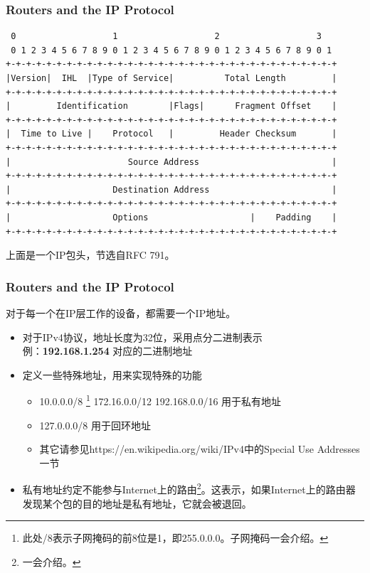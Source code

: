 \documentclass[11pt]{beamer}
\begin{document}
\begin{frame}[fragile]
\frametitle{Routers and the IP Protocol}
\fontsize{9pt}{9pt}
\begin{verbatim}
 0                   1                   2                   3
 0 1 2 3 4 5 6 7 8 9 0 1 2 3 4 5 6 7 8 9 0 1 2 3 4 5 6 7 8 9 0 1
+-+-+-+-+-+-+-+-+-+-+-+-+-+-+-+-+-+-+-+-+-+-+-+-+-+-+-+-+-+-+-+-+
|Version|  IHL  |Type of Service|          Total Length         |
+-+-+-+-+-+-+-+-+-+-+-+-+-+-+-+-+-+-+-+-+-+-+-+-+-+-+-+-+-+-+-+-+
|         Identification        |Flags|      Fragment Offset    |
+-+-+-+-+-+-+-+-+-+-+-+-+-+-+-+-+-+-+-+-+-+-+-+-+-+-+-+-+-+-+-+-+
|  Time to Live |    Protocol   |         Header Checksum       |
+-+-+-+-+-+-+-+-+-+-+-+-+-+-+-+-+-+-+-+-+-+-+-+-+-+-+-+-+-+-+-+-+
|                       Source Address                          |
+-+-+-+-+-+-+-+-+-+-+-+-+-+-+-+-+-+-+-+-+-+-+-+-+-+-+-+-+-+-+-+-+
|                    Destination Address                        |
+-+-+-+-+-+-+-+-+-+-+-+-+-+-+-+-+-+-+-+-+-+-+-+-+-+-+-+-+-+-+-+-+
|                    Options                    |    Padding    |
+-+-+-+-+-+-+-+-+-+-+-+-+-+-+-+-+-+-+-+-+-+-+-+-+-+-+-+-+-+-+-+-+
\end{verbatim}
\fontsize{11pt}{11pt}
上面是一个IP包头，节选自RFC 791。
\end{frame}

\begin{frame}
\frametitle{Routers and the IP Protocol}
对于每一个在IP层工作的设备，都需要一个IP地址。
\begin{itemize}
\item 对于IPv4协议，地址长度为32位，采用点分二进制表示\\
例：\textbf{192.168.1.254} 对应的二进制地址
\item 定义一些特殊地址，用来实现特殊的功能
\begin{itemize}
\item 10.0.0.0/8 \footnote{此处/8表示子网掩码的前8位是1，即255.0.0.0。子网掩码一会介绍。} 172.16.0.0/12 192.168.0.0/16 用于私有地址
\item 127.0.0.0/8 用于回环地址
\item 其它请参见https://en.wikipedia.org/wiki/IPv4中的Special Use Addresses一节
\end{itemize}
\item 私有地址约定不能参与Internet上的路由\footnote{一会介绍。}。这表示，如果Internet上的路由器发现某个包的目的地址是私有地址，它就会被退回。
\end{itemize}
\end{frame}
\end{document}
